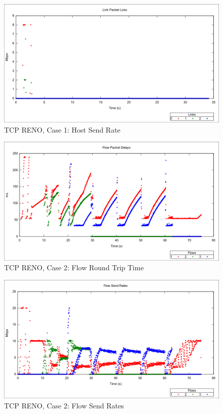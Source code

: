 \begin{figure}[htbp]
    \centering
    \includegraphics[width=\textwidth]{reno1/Link_Packet_Loss.png}
    \caption{TCP RENO, Case 1: Host Send Rate}
\end{figure}

\newpage
\clearpage


\begin{figure}[htbp]
    \centering
    \includegraphics[width=\textwidth]{reno2/Flow_RTT.png}
    \caption{TCP RENO, Case 2: Flow Round Trip Time}
\end{figure}

\begin{figure}[htbp]
    \centering
    \includegraphics[width=\textwidth]{reno2/Flow_Send_Rates.png}
    \caption{TCP RENO, Case 2: Flow Send Rates}
\end{figure}

